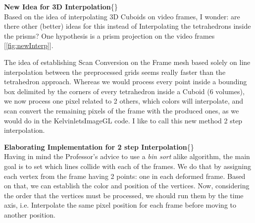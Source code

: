 \documentclass[12pt, a4paper]{report}
\newenvironment{loggentry}[2]%
{\noindent\textbf{#2}\newline\{\marginnote{#1}\}\newline\\}{\vspace{1.0cm}}
\begin{document}
	\begin{loggentry}{28-05-2019}{New Idea for 3D Interpolation}
		Based on the idea of interpolating 3D Cuboids on video frames, I wonder: are there other (better) ideas for this instead of Interpolating the tetrahedrons inside the prisms? One hypothesis is a prism projection on the video frames [\ref{fig:newInterp}].	

		The idea of establishing Scan Conversion on the Frame mesh based solely on line interpolation between the preprocessed grids seems really faster than the tetrahedron approach. Whereas we would process every point inside a bounding box delimited by the corners of every tetrahedron inside a Cuboid (6 volumes), we now process one pixel related to 2 others, which colors will interpolate, and scan convert the remaining pixels of the frame with the produced ones, as we would do in the KelvinletsImageGL code. I like to call this new method 2 step interpolation.  
	\end{loggentry}

	\begin{loggentry}{30-05-2019}{Elaborating Implementation for 2 step Interpolation}
			Having in mind the Professor's advice to use a \textit{bin sort} alike algorithm, the main goal is to set which lines collide with each of the frames. We do that by assigning each vertex from the frame having 2 points: one in each deformed frame. Based on that, we can establish the color and position of the vertices. Now, considering the order that the vertices must be processed, we should run them by the time axis, i.e. Interpolate the same pixel position for each frame before moving to another position.    
	\end{loggentry}
\end{document}
